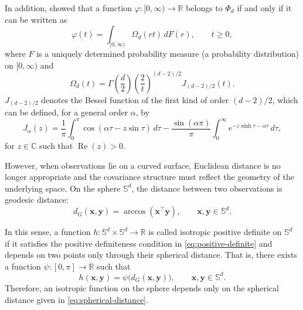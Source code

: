 \documentclass[12pt]{report} %
\newcommand{\bx}{\mathbf{x}}
\newcommand{\by}{\mathbf{y}}
\newcommand{\Sd}{\mathbb{S}^{d}}
\begin{document}
In addition, \citet{Schoenberg1938} showed that a function
$\varphi:[0,\infty)\to\mathbb{R}$ belongs to $\Phi_d$ if and only if it can be written as
\begin{equation*}
    \varphi(t) = \int_{[0,\infty)} \Omega_d(rt)\,dF(r), \qquad t\geq 0,
\end{equation*}
where $F$ is a uniquely determined probability measure (a probability distribution) on $[0,\infty)$ and
\begin{equation*}
    \Omega_d(t) = \Gamma\left(\frac{d}{2}\right)
    \left(\frac{2}{t}\right)^{(d-2)/2}
    J_{(d-2)/2}(t).
\end{equation*}
$J_{(d-2)/2}$ denotes the Bessel function of the first kind of order $(d-2)/2$, which can be defined, for a general order $\alpha$, by
\begin{equation*}
    J_{\alpha}(z) = \frac{1}{\pi} \int_{0}^{\pi} \cos\left(\alpha \tau - z\sin\tau\right)\,d\tau - \frac{\sin(\alpha\pi)}{\pi} \int_{0}^{\infty} e^{-z\sinh\tau-\alpha\tau}\,d\tau,
\end{equation*}
for $z\in\mathbb{C}$ such that $\operatorname{Re}(z)>0$.


However, when observations lie on a curved surface, Euclidean distance is no longer appropriate and the covariance structure must reflect the geometry of the underlying space. On the sphere $\Sd$, the  distance between two observations is
geodesic distance:
\begin{equation}
    \label{eq:spherical-distance}
    d_{G}(\bx,\by) = \arccos(\bx^\top\by), \qquad \bx,\by\in\mathbb{S}^d.
\end{equation}

In this sense, a function $h:\mathbb{S}^d\times\mathbb{S}^d\to\mathbb{R}$ is
called isotropic positive definite on $\Sd$ if it satisfies the
positive definiteness condition in \eqref{eq:positive-definite} and depends on two points only through their spherical distance. That is, there exists a
function $\psi:[0,\pi]\to\mathbb{R}$ such that
\begin{equation}
    \label{eq:spherical-iso}
    h(\bx,\by) =
    \psi\bigl(d_{G}(\bx,\by)\bigr),
    \qquad \bx,\by\in\mathbb{S}^d.
\end{equation}
Therefore, an isotropic function on the sphere depends only on the spherical
distance given in \eqref{eq:spherical-distance}.
\end{document}
